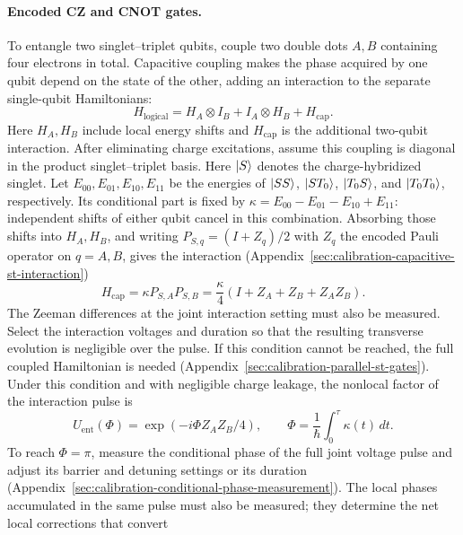 \paragraph{Encoded CZ and CNOT gates.}
To entangle two singlet--triplet qubits, couple two double dots
$A,B$ containing four electrons in total.
Capacitive coupling makes the phase acquired by one qubit depend
on the state of the other, adding an interaction to the separate
single-qubit Hamiltonians:
\begin{equation}
 H_{\mathrm{logical}}
   =H_A\otimes I_B+I_A\otimes H_B+H_{\mathrm{cap}}.
 \label{eq:st-coupled-logical-hamiltonian}
\end{equation}
Here $H_A,H_B$ include local energy shifts and $H_{\mathrm{cap}}$
is the additional two-qubit interaction.
After eliminating charge excitations, assume this coupling is
diagonal in the product singlet--triplet basis. Here $\lvert S\rangle$
denotes the charge-hybridized singlet. Let
$E_{00},E_{01},E_{10},E_{11}$ be the energies of $\lvert SS\rangle$,
$\lvert ST_0\rangle$, $\lvert T_0S\rangle$, and $\lvert T_0T_0\rangle$, respectively.
Its conditional part is fixed by
$\kappa=E_{00}-E_{01}-E_{10}+E_{11}$: independent shifts of
either qubit cancel in this combination. Absorbing those shifts
into $H_A,H_B$, and writing $P_{S,q}=(I+Z_q)/2$ with $Z_q$ the
encoded Pauli operator on $q=A,B$, gives the interaction
(Appendix~\ref{sec:calibration-capacitive-st-interaction})
\begin{equation}
 H_{\mathrm{cap}}=\kappa P_{S,A}P_{S,B}
     =\frac{\kappa}{4}(I+Z_A+Z_B+Z_AZ_B).
 \label{eq:st-capacitive-coupling}
\end{equation}
The Zeeman differences at the joint interaction setting must also
be measured. Select the interaction voltages and duration so that
the resulting transverse evolution is negligible over the pulse.
If this condition cannot be reached, the full coupled Hamiltonian is needed
(Appendix~\ref{sec:calibration-parallel-st-gates}). Under this
condition and with negligible charge leakage, the nonlocal factor
of the interaction pulse is
\begin{equation}
 U_{\mathrm{ent}}(\Phi)=\exp(-i\Phi Z_AZ_B/4),
 \qquad \Phi=\frac{1}{\hbar}\int_0^\tau\kappa(t)\,dt.
 \label{eq:st-entangling-gate}
\end{equation}
To reach $\Phi=\pi$, measure the conditional phase of the full
joint voltage pulse and adjust its barrier and detuning settings
or its duration (Appendix~\ref{sec:calibration-conditional-phase-measurement}).
The local phases accumulated in the same pulse must also be
measured; they determine the net local corrections that convert
